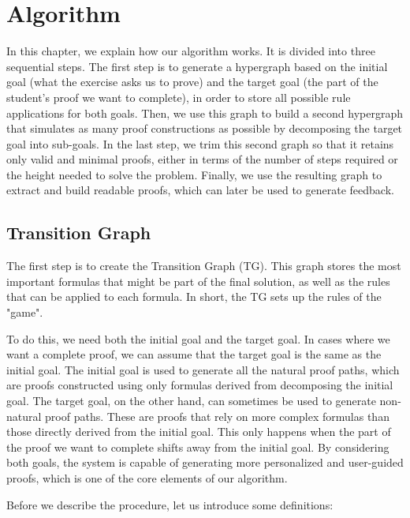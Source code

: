 \section{Algorithm}
In this chapter, we explain how our algorithm works. It is divided into three sequential steps.
The first step is to generate a hypergraph based on the initial goal (what the exercise asks us to prove) and the target goal (the part of the student's proof we want to complete), in order to store all possible rule applications for both goals. Then, we use this graph to build a second hypergraph that simulates as many proof constructions as possible by decomposing the target goal into sub-goals. In the last step, we trim this second graph so that it retains only valid and minimal proofs, either in terms of the number of steps required or the height needed to solve the problem. Finally, we use the resulting graph to extract and build readable proofs, which can later be used to generate feedback.

\subsection{Transition Graph}
The first step is to create the Transition Graph (TG). This graph stores the most important formulas that might be part of the final solution, as well as the rules that can be applied to each formula. In short, the TG sets up the rules of the "game".

To do this, we need both the initial goal and the target goal. In cases where we want a complete proof, we can assume that the target goal is the same as the initial goal. The initial goal is used to generate all the natural proof paths, which are proofs constructed using only formulas derived from decomposing the initial goal. The target goal, on the other hand, can sometimes be used to generate non-natural proof paths. These are proofs that rely on more complex formulas than those directly derived from the initial goal. This only happens when the part of the proof we want to complete shifts away from the initial goal. By considering both goals, the system is capable of generating more personalized and user-guided proofs, which is one of the core elements of our algorithm.

Before we describe the procedure, let us introduce some definitions:

